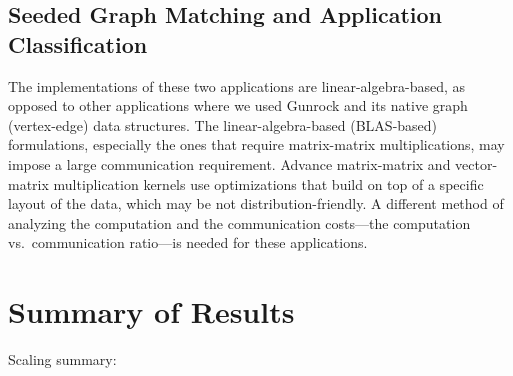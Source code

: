 \documentclass[10pt,oneside]{memoir}
\begin{document}
\hypertarget{seeded-graph-matching-and-application-classification}{%
\subsection{Seeded Graph Matching and Application
Classification}\label{seeded-graph-matching-and-application-classification}}

The implementations of these two applications are linear-algebra-based,
as opposed to other applications where we used Gunrock and its native
graph (vertex-edge) data structures. The linear-algebra-based
(BLAS-based) formulations, especially the ones that require
matrix-matrix multiplications, may impose a large communication
requirement. Advance matrix-matrix and vector-matrix multiplication
kernels use optimizations that build on top of a specific layout of the
data, which may be not distribution-friendly. A different method of
analyzing the computation and the communication costs---the computation
vs.~communication ratio---is needed for these applications.

\hypertarget{summary-of-results-10}{%
\section{Summary of Results}\label{summary-of-results-10}}

Scaling summary:
\end{document}
